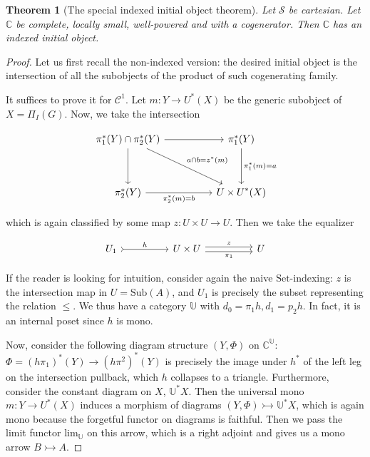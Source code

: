 \documentclass[10pt, oneside]{article}
\newtheorem{theorem}{Theorem}[section]
\begin{document}
\begin{theorem}[The special indexed initial object theorem]
    Let $\mathcal{S}$ be cartesian. Let $\mathbb{C}$ be complete, locally small, well-powered and with a cogenerator. Then $\mathbb{C}$ has an indexed initial object.
\end{theorem}
\begin{proof}
    Let us first recall the non-indexed version: the desired initial object is the intersection of all the subobjects of the product of such cogenerating family.
    
    It suffices to prove it for $\mathcal{C}^1$. Let $m: Y \to U^\ast(X)$ be the generic subobject of $X = \Pi_I (G)$. Now, we take the intersection
    
    \[\begin{tikzcd}[ampersand replacement=\&]
	{\pi_1^\ast (Y) \cap \pi_2^\ast (Y)} \&\& {\pi_1^\ast (Y)} \\
	\\
	{\pi_2^\ast (Y)} \&\& {{U \times U}^\ast (X)}
	\arrow["{\pi_2^\ast (m) = b}"', from=3-1, to=3-3]
	\arrow["{\pi_1^\ast (m) = a}", from=1-3, to=3-3]
	\arrow[from=1-1, to=3-1]
	\arrow[from=1-1, to=1-3]
	\arrow["{a \cap b = z^\ast(m)}", from=1-1, to=3-3]
    \end{tikzcd}\]

    \noindent which is again classified by some map $z: U \times U \to U$. Then we take the equalizer

    \[\begin{tikzcd}[ampersand replacement=\&]
	{U_1} \&\& {U \times U} \&\& U
	\arrow["z", shift left, from=1-3, to=1-5]
	\arrow["{\pi_1}"', shift right, from=1-3, to=1-5]
	\arrow["h", tail, from=1-1, to=1-3]
    \end{tikzcd}\]

    If the reader is looking for intuition, consider again the naive $\mathrm{Set}$-indexing: $z$ is the intersection map in $U = \mathrm{Sub}(A)$, and $U_1$ is precisely the subset representing the relation $\leq$. We thus have a category $\mathbb{U}$ with $d_0 = \pi_1 h, d_1 = p_2 h$. In fact, it is an internal poset since $h$ is mono.

    Now, consider the following diagram structure $(Y, \Phi)$ on $\mathbb{C}^\mathbb{U}$: $\Phi = (h \pi_1)^\ast (Y) \to (h \pi^2)^\ast (Y)$ is precisely the image under $h^\ast$ of the left leg on the intersection pullback, which $h$ collapses to a triangle.
    Furthermore, consider the constant diagram on $X$,  $\mathbb{U}^\ast X$. Then the universal mono $m: Y \to U^\ast (X)$ induces a morphism of diagrams $(Y, \Phi) \rightarrowtail \mathbb{U}^\ast X$, which is again mono because the forgetful functor on diagrams is faithful. Then we pass the limit functor $\mathrm{lim}_\mathbb{U}$ on this arrow, which is a right adjoint and gives us a mono arrow $B \rightarrowtail A$.


\end{proof}
\end{document}

